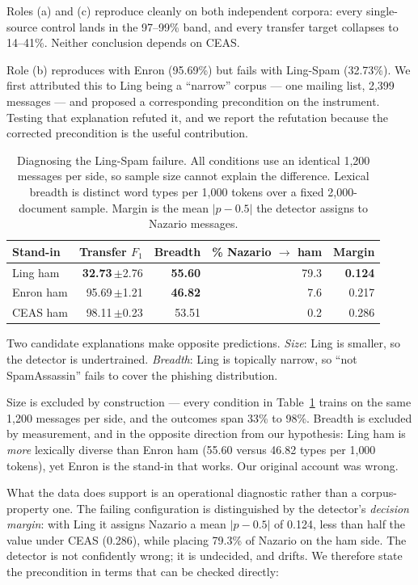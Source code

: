 \documentclass[twoside,11pt]{article}
\newcommand{\gd}[1]{\textbf{#1}}
\begin{document}
Roles (a) and (c) reproduce cleanly on both independent corpora: every
single-source control lands in the 97--99\% band, and every transfer target
collapses to 14--41\%. Neither conclusion depends on CEAS.

Role (b) reproduces with Enron (95.69\%) but fails with Ling-Spam (32.73\%).
We first attributed this to Ling being a ``narrow'' corpus --- one mailing
list, 2{,}399 messages --- and proposed a corresponding precondition on the
instrument. Testing that explanation refuted it, and we report the refutation
because the corrected precondition is the useful contribution.

\begin{table}[t]
\centering\small
\caption{Diagnosing the Ling-Spam failure. All conditions use an identical
1{,}200 messages per side, so sample size cannot explain the difference.
Lexical breadth is distinct word types per 1{,}000 tokens over a fixed
2{,}000-document sample. Margin is the mean $|p-0.5|$ the detector assigns to
Nazario messages.}
\label{tab:whyling}
\begin{tabular}{lrrrr}
\toprule
Stand-in & Transfer $F_1$ & Breadth & \% Nazario $\to$ ham & Margin \\
\midrule
Ling ham  & \gd{32.73}\,$\pm$2.76 & \gd{55.60} & 79.3 & \gd{0.124} \\
Enron ham & 95.69\,$\pm$1.21 & \gd{46.82} & 7.6  & 0.217 \\
CEAS ham  & 98.11\,$\pm$0.23 & 53.51 & 0.2  & 0.286 \\
\bottomrule
\end{tabular}
\end{table}

Two candidate explanations make opposite predictions. \emph{Size}: Ling is
smaller, so the detector is undertrained. \emph{Breadth}: Ling is
topically narrow, so ``not SpamAssassin'' fails to cover the phishing
distribution.

Size is excluded by construction --- every condition in
Table~\ref{tab:whyling} trains on the same 1{,}200 messages per side, and the
outcomes span 33\% to 98\%. Breadth is excluded by measurement, and in the
opposite direction from our hypothesis: Ling ham is \emph{more} lexically
diverse than Enron ham (55.60 versus 46.82 types per 1{,}000 tokens), yet
Enron is the stand-in that works. Our original account was wrong.

What the data does support is an operational diagnostic rather than a
corpus-property one. The failing configuration is distinguished by the
detector's \emph{decision margin}: with Ling it assigns Nazario a mean
$|p-0.5|$ of 0.124, less than half the value under CEAS (0.286), while placing
79.3\% of Nazario on the ham side. The detector is not confidently wrong; it
is undecided, and drifts. We therefore state the precondition in terms that
can be checked directly:
\end{document}
